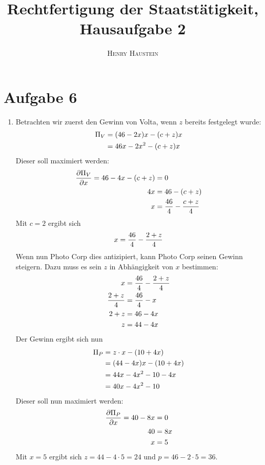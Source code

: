 \documentclass{article}
\title{\textbf{Rechtfertigung der Staatstätigkeit, Hausaufgabe 2}}
\author{\textsc{Henry Haustein}}
\date{}
\begin{document}
	\maketitle
	
	\section*{Aufgabe 6}
	\begin{enumerate}[label=(\alph*)]
		\item Betrachten wir zuerst den Gewinn von Volta, wenn $z$ bereits festgelegt wurde:
		\begin{align}
			\Pi_V &= (46-2x)x - (c+z)x \notag \\
			&= 46x - 2x^2 - (c+z)x \notag
		\end{align}
		Dieser soll maximiert werden:
		\begin{align}
			\frac{\partial\Pi_V}{\partial x} = 46-4x - (c+z) &= 0 \notag \\
			4x &= 46 - (c+z) \notag \\
			x &= \frac{46}{4} - \frac{c+z}{4} \notag
		\end{align}
		Mit $c=2$ ergibt sich
		\begin{align}
			x = \frac{46}{4} - \frac{2+z}{4} \notag
		\end{align}
		Wenn nun Photo Corp dies antizipiert, kann Photo Corp seinen Gewinn steigern. Dazu muss es sein $z$ in Abhängigkeit von $x$ bestimmen:
		\begin{align}
			x &= \frac{46}{4} - \frac{2+z}{4} \notag \\
			\frac{2+z}{4} &= \frac{46}{4} - x \notag \\
			2+z &= 46-4x \notag \\
			z &= 44-4x \notag
		\end{align}
		Der Gewinn ergibt sich nun
		\begin{align}
			\Pi_P &= z\cdot x - (10+4x) \notag \\
			&= (44-4x)x - (10+4x) \notag \\
			&= 44x-4x^2-10-4x \notag \\
			&= 40x - 4x^2 - 10 \notag
		\end{align}
		Dieser soll nun maximiert werden:
		\begin{align}
			\frac{\partial\Pi_P}{\partial x} = 40-8x &= 0 \notag \\
			40 &= 8x \notag \\
			x &= 5 \notag
		\end{align}
		Mit $x=5$ ergibt sich $z = 44-4\cdot 5 = 24$ und $p=46-2\cdot 5 = 36$.

\end{enumerate}
\end{document}

